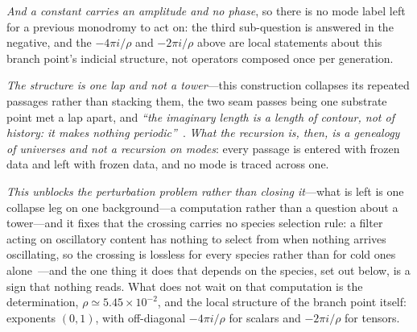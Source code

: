 \documentclass[11pt,a4paper]{article}
\theoremstyle{plain}
\theoremstyle{definition}
\theoremstyle{remark}
\begin{document}
\emph{And a constant carries an amplitude and no phase}, so there is no mode label left for a previous monodromy to act on: the third sub-question is answered in the negative, and the $-4\pi i/\rho$ and $-2\pi i/\rho$ above are local statements about this branch point's indicial structure, not operators composed once per generation. 

\emph{The structure is one lap and not a tower}---this construction collapses its repeated passages rather than stacking them, the two seam passes being one substrate point met a lap apart, and \emph{``the imaginary length is a length of contour, not of history: it makes nothing periodic''}~\cite{JanzenCRframework}. \emph{What the recursion is, then, is a genealogy of universes and not a recursion on modes}: every passage is entered with frozen data and left with frozen data, and no mode is traced across one. 

\emph{This unblocks the perturbation problem rather than closing it}---what is left is one collapse leg on one background---a computation rather than a question about a tower---and it fixes that the crossing carries no species selection rule: a filter acting on oscillatory content has nothing to select from when nothing arrives oscillating, so the crossing is lossless for every species rather than for cold ones alone~\cite{JanzenCRframework}---and the one thing it does that depends on the species, set out below, is a sign that nothing reads. What does not wait on that computation is the determination, $\rho\simeq5.45\times10^{-2}$, and the local structure of the branch point itself: exponents $(0,1)$, with off-diagonal $-4\pi i/\rho$ for scalars and $-2\pi i/\rho$ for tensors. 
\end{document}
